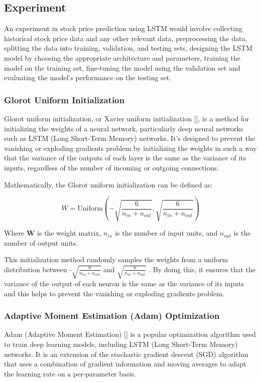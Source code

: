 \documentclass[a4paper]{article}
\begin{document}
\subsection{Experiment}
An experiment in stock price prediction using LSTM would involve collecting historical stock price data and any other relevant data, preprocessing the data, splitting the data into training, validation, and testing sets, designing the LSTM model by choosing the appropriate architecture and parameters, training the model on the training set, fine-tuning the model using the validation set and evaluating the model's performance on the testing set.
\subsubsection{Glorot Uniform Initialization}
Glorot uniform initialization, or Xavier uniform initialization [\cite{glorot2010understanding}], is a method for initializing the weights of a neural network, particularly deep neural networks such as LSTM (Long Short-Term Memory) networks. It's designed to prevent the vanishing or exploding gradients problem by initializing the weights in such a way that the variance of the outputs of each layer is the same as the variance of its inputs, regardless of the number of incoming or outgoing connections.

Mathematically, the Glorot uniform initialization can be defined as:

$$W = \text{Uniform}(-\sqrt{\frac{6}{n_{in} + n_{out}}},\sqrt{\frac{6}{n_{in} + n_{out}}})$$

Where $\mathbf{W}$ is the weight matrix, $n_{in}$ is the number of input units, and $n_{out}$ is the number of output units.

This initialization method randomly samples the weights from a uniform distribution between -$\sqrt{\frac{6}{n_{in} + n_{out}}}$ and $\sqrt{\frac{6}{n_{in} + n_{out}}}$ . By doing this, it ensures that the variance of the output of each neuron is the same as the variance of its inputs and this helps to prevent the vanishing or exploding gradients problem.
\subsubsection{Adaptive Moment Estimation (Adam) Optimization}
Adam (Adaptive Moment Estimation) [\cite{kingma2014adam}] is a popular optimization algorithm used to train deep learning models, including LSTM (Long Short-Term Memory) networks. It is an extension of the stochastic gradient descent (SGD) algorithm that uses a combination of gradient information and moving averages to adapt the learning rate on a per-parameter basis.
\end{document}
